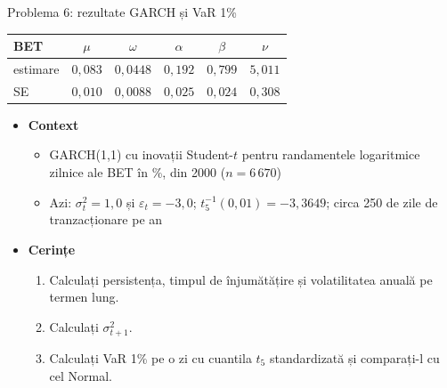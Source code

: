 \begin{frame}{Problema 6: rezultate GARCH și VaR 1\%}
\itemsize{\footnotesize}
\begin{center}
\scriptsize
\begin{tabular}{lccccc}
\toprule
\textbf{BET} & $\mu$ & $\omega$ & $\alpha$ & $\beta$ & $\nu$ \\
\midrule
estimare & $0{,}083$ & $0{,}0448$ & $0{,}192$ & $0{,}799$ & $5{,}011$ \\
SE & $0{,}010$ & $0{,}0088$ & $0{,}025$ & $0{,}024$ & $0{,}308$ \\
\bottomrule
\end{tabular}
\end{center}
\begin{itemize}
    \item \textbf{Context}
    \begin{itemize}
        \item GARCH(1,1) cu inovații Student-$t$ pentru randamentele logaritmice zilnice ale BET în \%, din 2000 ($n = 6\,670$)
        \item Azi: $\sigma_t^2 = 1{,}0$ și $\varepsilon_t = -3{,}0$; $t_5^{-1}(0{,}01) = \ensuremath{-}3{,}3649$; circa 250 de zile de tranzacționare pe an
    \end{itemize}
    \item \textbf{Cerințe}
\begin{enumerate}
    \item Calculați persistența, timpul de înjumătățire și volatilitatea anuală pe termen lung.
    \item Calculați $\sigma_{t+1}^2$.
    \item Calculați VaR 1\% pe o zi cu cuantila $t_5$ standardizată și comparați-l cu cel Normal.
\end{enumerate}
\end{itemize}
\end{frame}

